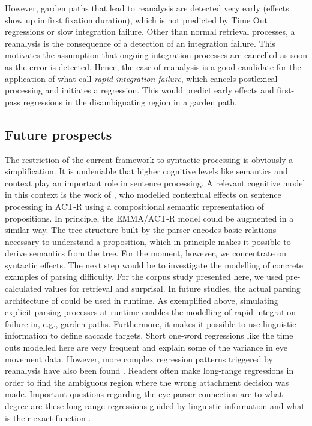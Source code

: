 \documentclass{cambridge7A}\usepackage[]{graphicx}\usepackage[]{color}
\begin{document}
However, garden paths that lead to reanalysis are detected very early (effects show up in first fixation duration), which is not predicted by Time Out regressions or slow integration failure. 
Other than normal retrieval processes, a reanalysis is the consequence of a detection of an integration failure.  This motivates the assumption that ongoing integration processes are cancelled as soon as the error is detected.  Hence, the case of reanalysis is a good candidate for the application of what \cite{Reichle1998} call  \emph{rapid integration failure}, which cancels postlexical processing and initiates a regression.  This would predict early effects and first-pass regressions in the disambiguating region in a garden path.

\subsection{Future prospects}
The restriction of the current framework to syntactic processing is obviously a simplification. It is undeniable that higher cognitive levels like semantics and context play an important role in sentence processing.  A relevant cognitive model in this context is the work of \cite{Budiu2004}, who modelled contextual effects on sentence processing in ACT-R using a compositional semantic representation of propositions. In principle, the EMMA/ACT-R model could be augmented in a similar way.
The tree structure built by the \cite{LewisVasishth2005} parser encodes basic relations necessary to understand a proposition, which in principle makes it possible to derive semantics from the tree. For the moment, however, we concentrate on syntactic effects.
The next step would be to investigate the modelling of concrete examples of parsing difficulty. For the corpus study presented here, we used pre-calculated values for retrieval and surprisal. In future studies, the actual parsing architecture of \cite{LewisVasishth2005} could be used in runtime.  As exemplified above, simulating explicit parsing processes at runtime enables the modelling of rapid integration failure in, e.g., garden paths. Furthermore, it makes it possible to use linguistic information to define saccade targets. Short one-word regressions like the time outs modelled here are very frequent and explain some of the variance in eye movement data.  However, more complex regression patterns triggered by reanalysis have also been found \citep[e.g.,][]{FrazierRayner1982,MalsburgVasishth2011,MalsburgVasishth2012,Meseguer2002}. Readers often make long-range regressions in order to find the ambiguous region where the wrong attachment decision was made. Important questions regarding the eye-parser connection are to what degree are these long-range regressions guided by linguistic information and what is their exact function \citep[e.g.,][]{Booth2013,Inhoff:2005p140,MitchellEtAl2008,Weger2007}.
\end{document}
